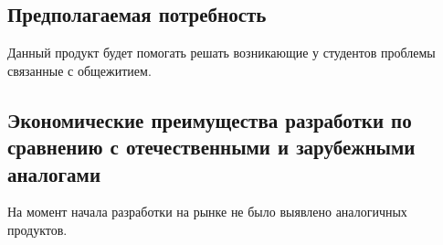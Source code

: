 \documentclass{../includes/TechDoc}
\begin{document}
    \subsection{Предполагаемая потребность}

    Данный продукт будет помогать решать возникающие у студентов проблемы связанные с общежитием.

    \subsection{Экономические преимущества разработки по сравнению с отечественными и зарубежными аналогами}

    На момент начала разработки на рынке не было выявлено аналогичных продуктов.

    \registrationList
\end{document}
